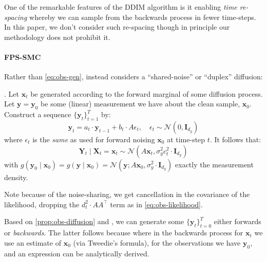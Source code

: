\begin{remark}
    One of the remarkable features of the DDIM algorithm is it enabling \emph{time re-spacing}
    whereby we can sample from the backwards process in fewer time-steps. In this paper, we don't
    consider such re-spacing though in principle our methodology does not prohibit it.
\end{remark}

\paragraph{FPS-SMC}

Rather than \autoref{eq:obs-gen}, \textcite{douDiffusionPosteriorSampling2023} instead considers
a ``shared-noise'' or ``duplex'' diffusion:

\begin{proposition} \label{prop:obs-diffusion}
    \textcite[Proposition B.1]{douDiffusionPosteriorSampling2023}.
    Let $\mathbf{x}_t$ be generated according to the forward marginal of some diffusion process.
    Let $\mathbf{y} = \mathbf{y}_0$ be some (linear) measurement we have about the clean sample,
    $\mathbf{x}_0$. Construct a sequence $\{\mathbf{y}_t\}_{t=1}^T$ by:
    \begin{equation*}
        \mathbf{y}_t = a_t\cdot \mathbf{y}_{t-1} + b_t\cdot A\epsilon_t,\quad \epsilon_t \sim \mathcal{N}(0, \mathbf{I}_{d_y})
    \end{equation*}
    where $\epsilon_t$ is the \emph{same} as used for forward noising $\mathbf{x}_0$ at time-step $t$.
    It follows that:
    \begin{equation}
        \mathbf{Y}_t \mid \mathbf{X}_t = \mathbf{x}_t \sim \mathcal{N}(A\mathbf{x}_t, \sigma_y^2c_t^2\cdot \mathbf{I}_{d_y}) \label{eq:obs-likelihood-dou}
    \end{equation}
    with $g(\mathbf{y}_0 \mid \mathbf{x}_0) = g(\mathbf{y} \mid \mathbf{x}_0) = \mathcal{N}(\mathbf{y}; A\mathbf{x}_0, \sigma_y^2\cdot \mathbf{I}_{d_y})$
    exactly the measurement density.
\end{proposition}

Note because of the noise-sharing, we get cancellation in the covariance of the likelihood, dropping
the $d_t^2\cdot AA^\top$ term as in \autoref{eq:obs-likelihood}.

Based on \autoref{prop:obs-diffusion} and \textcite[Remark B.1]{douDiffusionPosteriorSampling2023},
we can generate some $\{\mathbf{y}_t\}_{t=0}^T$ either forwards or \emph{backwards}.
The latter follows because where in the backwards process for $\mathbf{x}_t$ we use an estimate of
$\mathbf{x}_0$ (via Tweedie's formula), for the observations we have $\mathbf{y}_0$, and an
expression can be analytically derived.
